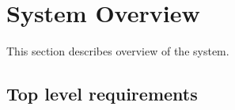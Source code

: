 \chapter{System Overview
\label{chap:sys_overview}}

This section describes overview of the system.

\section{Top level requirements} 